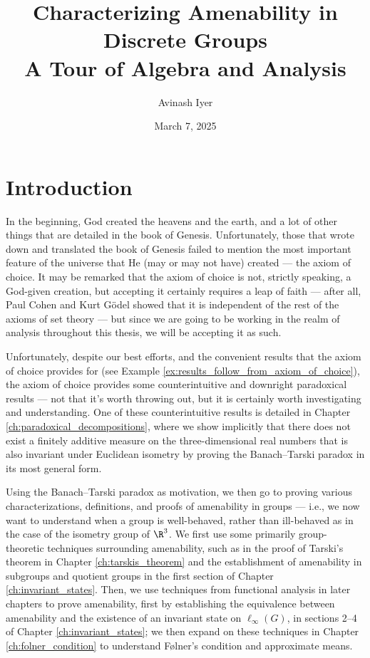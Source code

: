 \documentclass[10pt]{package2}
\title{Characterizing Amenability in Discrete Groups\\{\large A Tour of Algebra and Analysis}}
\author{Avinash Iyer}
\date{March 7, 2025}
\begin{document}
\maketitle
\RaggedRight
\tableofcontents
\chapter{Introduction}
In the beginning, God created the heavens and the earth, and a lot of other things that are detailed in the book of Genesis. Unfortunately, those that wrote down and translated the book of Genesis failed to mention the most important feature of the universe that He (may or may not have) created --- the axiom of choice. It may be remarked that the axiom of choice is not, strictly speaking, a God-given creation, but accepting it certainly requires a leap of faith --- after all, Paul Cohen and Kurt Gödel showed that it is independent of the rest of the axioms of set theory --- but since we are going to be working in the realm of analysis throughout this thesis, we will be accepting it as such.\newline

Unfortunately, despite our best efforts, and the convenient results that the axiom of choice provides for (see Example \ref{ex:results_follow_from_axiom_of_choice}), the axiom of choice provides some counterintuitive and downright paradoxical results --- not that it's worth throwing out, but it is certainly worth investigating and understanding. One of these counterintuitive results is detailed in Chapter \ref{ch:paradoxical_decompositions}, where we show implicitly that there does not exist a finitely additive measure on the three-dimensional real numbers that is also invariant under Euclidean isometry by proving the Banach--Tarski paradox in its most general form.\newline

Using the Banach--Tarski paradox as motivation, we then go to proving various characterizations, definitions, and proofs of amenability in groups --- i.e., we now want to understand when a group is well-behaved, rather than ill-behaved as in the case of the isometry group of $\R^3$. We first use some primarily group-theoretic techniques surrounding amenability, such as in the proof of Tarski's theorem in Chapter \ref{ch:tarskis_theorem} and the establishment of amenability in subgroups and quotient groups in the first section of Chapter \ref{ch:invariant_states}. Then, we use techniques from functional analysis in later chapters to prove amenability, first by establishing the equivalence between amenability and the existence of an invariant state on $\ell_{\infty}(G)$, in sections 2--4 of Chapter \ref{ch:invariant_states}; we then expand on these techniques in Chapter \ref{ch:folner_condition} to understand Følner's condition and approximate means.\newline
\end{document}
